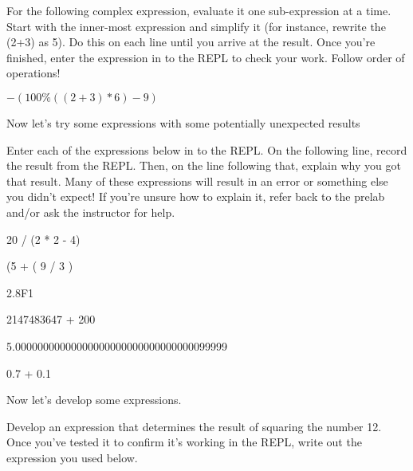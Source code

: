 \begin{eval}
For the following complex expression, evaluate it one sub-expression at a time. Start 
with the inner-most expression and simplify it (for instance, rewrite the (2+3) as 5). 
Do this on each line until you arrive at the result. Once you're finished, enter the
expression in to the REPL to check your work. Follow order of operations!
\begin{sevalenum}
\item $-(100 \% ((2+3) * 6) - 9)$

\evallinefive

\end{sevalenum}
\end{eval}

Now let's try some expressions with some potentially unexpected results

\begin{eval}
Enter each of the expressions below in to the REPL. On the following line, record the 
result from the REPL. Then, on the line following that, explain why you got that 
result. Many of these expressions will result in an error or something else you didn't expect! If you're unsure how to explain it, refer back to the prelab and/or ask the instructor for help. 
\begin{sevalenum}
\item 20 / (2 * 2 - 4)

\evallinetwo

\item (5 + ( 9  / 3 )

\evallinetwo

\item 2.8F1

\evallinetwo

\item 2147483647 + 200

\evallinetwo

\item 5.00000000000000000000000000000000099999

\evallinetwo

\item 0.7 + 0.1

\evallinetwo

\end{sevalenum}
\end{eval}


Now let's develop some expressions. 

\begin{exer}
Develop an expression that determines the result of squaring the number 12.
Once you've tested it to confirm it's working in the REPL, write out the 
expression you used below.

\evalline
\end{exer}


